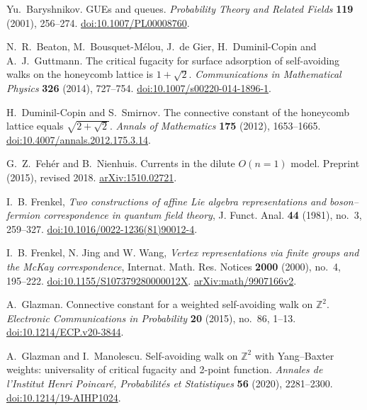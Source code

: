 Yu.~Baryshnikov. GUEs and queues.
\emph{Probability Theory and Related Fields} \textbf{119} (2001), 256--274.
\href{https://doi.org/10.1007/PL00008760}{doi:10.1007/PL00008760}.

N.~R.~Beaton, M.~Bousquet-M\'elou, J.~de Gier, H.~Duminil-Copin and
A.~J.~Guttmann. The critical fugacity for surface adsorption of
self-avoiding walks on the honeycomb lattice is $1+\sqrt2$.
\emph{Communications in Mathematical Physics} \textbf{326} (2014), 727--754.
\href{https://doi.org/10.1007/s00220-014-1896-1}{doi:10.1007/s00220-014-1896-1}.

H.~Duminil-Copin and S.~Smirnov.
The connective constant of the honeycomb lattice equals $\sqrt{2+\sqrt2}$.
\emph{Annals of Mathematics} \textbf{175} (2012), 1653--1665.
\href{https://doi.org/10.4007/annals.2012.175.3.14}{doi:10.4007/annals.2012.175.3.14}.

G.~Z.~Feh\'er and B.~Nienhuis.
Currents in the dilute $O(n=1)$ model.
Preprint (2015), revised 2018.
\href{https://arxiv.org/abs/1510.02721}{arXiv:1510.02721}.

I.~B. Frenkel,
\emph{Two constructions of affine Lie algebra representations and
boson--fermion correspondence in quantum field theory},
J. Funct. Anal. \textbf{44} (1981), no.~3, 259--327.
\href{https://doi.org/10.1016/0022-1236(81)90012-4}{doi:10.1016/0022-1236(81)90012-4}.

I.~B. Frenkel, N. Jing and W. Wang,
\emph{Vertex representations via finite groups and the McKay correspondence},
Internat. Math. Res. Notices \textbf{2000} (2000), no.~4, 195--222.
\href{https://doi.org/10.1155/S107379280000012X}{doi:10.1155/S107379280000012X}.
\href{https://arxiv.org/abs/math/9907166v2}{arXiv:math/9907166v2}.

A.~Glazman. Connective constant for a weighted self-avoiding walk on
$\mathbb Z^2$. \emph{Electronic Communications in Probability}
\textbf{20} (2015), no.~86, 1--13.
\href{https://doi.org/10.1214/ECP.v20-3844}{doi:10.1214/ECP.v20-3844}.

A.~Glazman and I.~Manolescu.
Self-avoiding walk on $\mathbb Z^2$ with Yang--Baxter weights:
universality of critical fugacity and 2-point function.
\emph{Annales de l'Institut Henri Poincar\'e, Probabilit\'es et Statistiques}
\textbf{56} (2020), 2281--2300.
\href{https://doi.org/10.1214/19-AIHP1024}{doi:10.1214/19-AIHP1024}.

